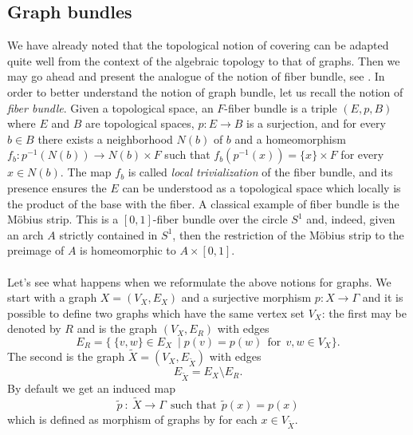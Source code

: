 \documentclass{amsart}
\theoremstyle{definition}
\numberwithin{equation}{section}
\begin{document}
\subsection{Graph bundles} 
We have already noted that the topological notion of covering can be adapted quite well from the context of the algebraic topology to that of graphs. Then we may go ahead and present the analogue of the notion of fiber bundle, see \cite[Chapter I, \S 5, \S 8, \S 9]{ttd}.  
In order to better understand the notion of graph bundle, let us recall the notion of \textit{fiber bundle}. Given a topological space, an $F$-fiber bundle is a triple $(E,p,B)$ where $E$ and $B$ are topological spaces, $p: E \longrightarrow B$ is a surjection, and for every $b \in B$ there exists a neighborhood $N(b)$ of $b$ and a homeomorphism $f_b: p^{-1}(N(b)) \longrightarrow N(b) \times F$ such that $f_b(p^{-1}(x)) = \{x\} \times F$ for every $x \in N(b)$. The map $f_b$ is called \textit{local trivialization} of the fiber bundle, and its presence ensures the $E$ can be understood as a topological space which locally is the product of the base with the fiber. A classical example of fiber bundle is the M\"obius strip. This is a $[0,1]$-fiber bundle over the circle $S^1$ and, indeed, given an arch $A$ strictly contained in $S^1$, then the restriction of the M\"obius strip to the preimage of $A$ is homeomorphic to $A \times [0,1]$.
\\
\\Let's see what happens when we reformulate the above notions for graphs. We start with a graph $X= (V_X, E_X)$ and a surjective morphism $p: X \longrightarrow \Gamma$ and it is possible to define two graphs which have the same vertex set $V_X$: the first  may be denoted by $R$ and is the graph $(V_{X}, E_R)$ with edges  \begin{equation}E_R = \{ \ \{v,w\} \in E_X \ \mid  p(v) = p(w) \ \ \mbox{for} \  \ v,w \in V_X \}.\end{equation} The second is the graph $\widetilde{X} = (V_{X}, E_{\widetilde{X}})$ with edges \begin{equation} E_{\widetilde{X}} = E_X \setminus E_R.
\end{equation} By default  we get an induced map
\begin{equation} 
\widetilde{p}  \ :  \ \widetilde{X} \longrightarrow \Gamma  \ \ \mbox{such that} \ \ \widetilde{p}(x) = p(x) 
\end{equation} 
which is defined as morphism of graphs by  for each  $x \in V_{\widetilde{X}}$. 
\end{document}
